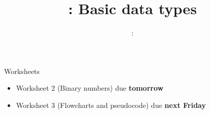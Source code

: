 \usepackage{../../beamerthemeFalmouthGamesAcademy}
\usepackage[utf8]{inputenc}
\usepackage{multimedia}
\graphicspath{ {../../} }

\lstset{language=Python,
    keepspaces=true,
    breaklines=false
}

\usepackage[normalem]{ulem}
\usepackage{wasysym}

\usepackage{algpseudocode}

\usepackage{pdfpages}

\usetikzlibrary{arrows,automata}




\title{\sessionnumber: Basic data types}
\subtitle{\modulecode: \moduletitle}

\frame{\titlepage} 



\begin{frame}{Worksheets}
	\begin{itemize}
		\item Worksheet 2 (Binary numbers) due \textbf{tomorrow}
		\item Worksheet 3 (Flowcharts and pseudocode) due \textbf{next Friday}
	\end{itemize}
\end{frame}








